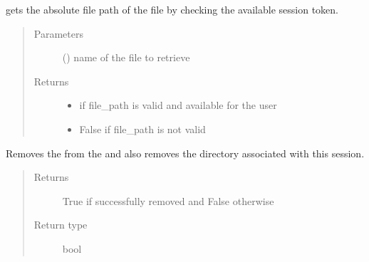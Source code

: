 \documentclass[letterpaper,10pt,english]{sphinxmanual}
\begin{document}
\begin{fulllineitems}
\label{\detokenize{docs/source/application.controllers:application.controllers.file_actions.get_audio_file_path}}
gets the absolute file path of the file by checking the available session token.
\begin{quote}\begin{description}
\item[{Parameters}] \leavevmode
{} () \textendash{} name of the file to retrieve

\item[{Returns}] \leavevmode
\begin{itemize}
\item {} 
 \textendash{} if file\_path is valid and available for the user

\item {} 
 \textendash{} False if file\_path is not valid

\end{itemize}


\end{description}\end{quote}

\end{fulllineitems}


\begin{fulllineitems}
\label{\detokenize{docs/source/application.controllers:application.controllers.file_actions.remove_session_token}}
Removes the  from the 
and also removes the directory associated with this session.
\begin{quote}\begin{description}
\item[{Returns}] \leavevmode
True if successfully removed and False otherwise

\item[{Return type}] \leavevmode
bool

\end{description}\end{quote}

\end{fulllineitems}
\end{document}
